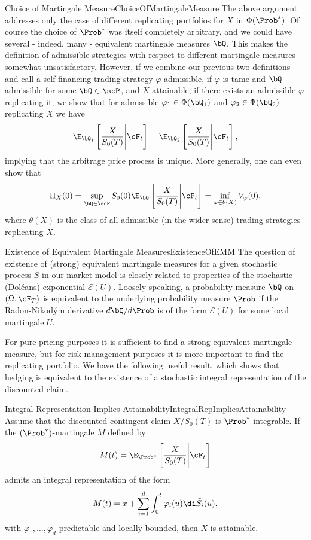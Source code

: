 \begin{xattention}{Choice of Martingale Measure}{ChoiceOfMartingaleMeasure}
	The above argument addresses only the case of different replicating portfolios for $X$ in $\Phi(\Prob^*)$. Of course the choice of $\Prob^*$ was itself completely arbitrary, and we could have several - indeed, many - equivalent martingale measures $\bQ$. This makes the definition of admissible strategies with respect to different martingale measures somewhat unsatisfactory. However, if we combine our previous two definitions and call a self-financing trading strategy $\varphi$ admissible, if $\varphi$ is tame and $\bQ$-admissible for some $\bQ \in \scP$, and $X$ attainable, if there exists an admissible $\varphi$ replicating it, we show that for admissible $\varphi_1 \in \Phi(\bQ_1)$ and $\varphi_2 \in \Phi(\bQ_2)$ replicating $X$ we have
	\[
		\E_{\bQ_1} \left[ \frac{X}{S_0(T)} \Bigg| \cF_t \right] = \E_{\bQ_2} \left[ \frac{X}{S_0(T)} \Bigg| \cF_t \right],
	\]
	implying that the arbitrage price process is unique. More generally, one can even show that
	\[
		\Pi_X(0) = \sup_{\bQ \in \scP} S_0(0)\E_{\bQ} \left[ \frac{X}{S_0(T)} \Bigg| \cF_t \right] = \inf_{\varphi \in \theta(X)} V_{\varphi}(0),
	\]
	where $\theta(X)$ is the class of all admissible (in the wider sense) trading strategies replicating $X$.
\end{xattention}

\begin{xtip}{Existence of Equivalent Martingale Measures}{ExistenceOfEMM}
	The question of existence of (strong) equivalent martingale measures for a given stochastic process $S$ in our market model is closely related to properties of the stochastic (Doléans) exponential $\mathcal{E}(U)$. Loosely speaking, a probability measure $\bQ$ on $(\Omega, \cF_T)$ is equivalent to the underlying probability measure $\Prob$ if the Radon-Nikodým derivative $d\bQ/d\Prob$ is of the form $\mathcal{E}(U)$ for some local martingale $U$.
\end{xtip}

For pure pricing purposes it is sufficient to find a strong equivalent martingale measure, but for risk-management purposes it is more important to find the replicating portfolio. We have the following useful result, which shows that hedging is equivalent to the existence of a stochastic integral representation of the discounted claim.

\begin{lem}{Integral Representation Implies Attainability}{IntegralRepImpliesAttainability}
	Assume that the discounted contingent claim $X/S_0(T)$ is $\Prob^*$-integrable. If the $(\Prob^*)$-martingale $M$ defined by
	\[
		M(t) = \E_{\Prob^*} \left[ \frac{X}{S_0(T)} \Bigg| \cF_t \right]
	\]
	admits an integral representation of the form
	\[
		M(t) = x + \sum_{i=1}^d \int_0^t \varphi_i(u) \di \tilde{S}_i(u),
	\]
	with $\varphi_1, \dots, \varphi_d$ predictable and locally bounded, then $X$ is attainable.
\end{lem}

